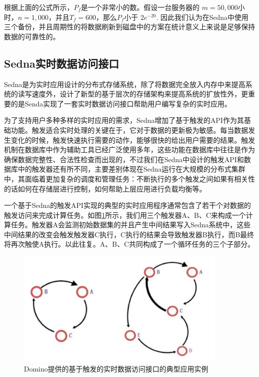 根据上面的公式所示，$P_{f}$是一个非常小的数。假设一台服务器的
$m=50,000$小时，$n=1,000$，并且$T_{f}=600$，那么$P_{f}$小于
$2e^{-20}$. 因此我们认为在Sedna中使用三个备份，并且周期性的将数据刷新到磁盘中的方案在统计意义上来说是足够保持数据的可靠性的。


\subsection{Sedna实时数据访问接口}

Sedna是为实时应用设计的分布式存储系统，除了将数据完全放入内存中来提高系统的读写速度外，设计了新型的基于层次的存储架构来提高系统的扩放性外，更重要的是Senda实现了一套实时数据访问接口帮助用户编写复杂的实时应用。

为了支持用户多种多样的实时应用的需求，Sedna增加了基于触发的API作为其基础功能。触发适合实时处理的关键在于，它对于数据的更新极为敏感。每当数据发生变化的时候，触发快速执行需要的动作，能够很快的给出用户需要的结果。触发机制在数据库中作为辅助工具已经广泛使用多年，这些功能在数据库中往往是作为确保数据完整性、合法性检查而出现的，不过我们在Sedna中设计的触发API和数据库中的触发器还有所不同，主要差别体现在Sedna运行在大规模的分布式集群中，其面临着更加复杂的调度和管理任务：不断执行的多个触发之间如果有相关性的话如何在存储层进行控制，如何帮助上层应用进行负载均衡等。

一个基于Sedna的触发API实现的典型的实时应用程序通常包含了若干个对数据的触发访问来完成计算任务。如图\ref{fig:triggers}所示，我们用三个触发器A、B、C来构成一个计算任务。触发器A会监测初始数据集的并且产生中间结果写入Sedna系统中，这些中间结果的改变会触发触发器C执行，C执行的结果会导致触发器B执行，而B最终将再次触使A执行。以此往复。A、B、C共同构成了一个循环任务的三个子部分。

\begin{figure}[h!]
  \begin{center}
    \includegraphics[width=4in]{../figures/domino.pdf}
    \caption{Domino提供的基于触发的实时数据访问接口的典型应用实例}
    \label{fig:triggers}
  \end{center}
\end{figure}

